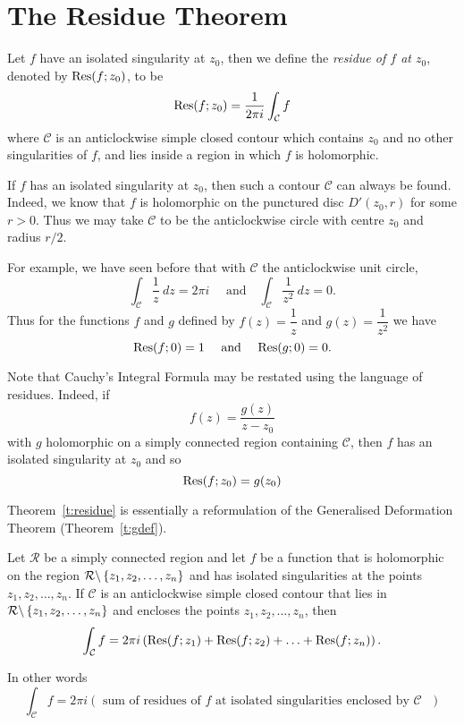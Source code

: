 \section{The Residue Theorem}

\begin{definition}
Let $f$ have an isolated singularity at $z_0$, then we define the \emph{residue of $f$ at $z_0$}, denoted by $\mathrm{Res} (f;z_0)$, to be
\[
\mathrm{Res} (f;z_0) = \frac{1}{2\pi i} \int_{\mathcal{C}} f
\]
where $\mathcal{C}$ is an anticlockwise simple closed contour which contains $z_0$ and no other singularities of $f$, and lies inside a region in which $f$ is holomorphic.
\end{definition}
If $f$ has an isolated singularity at $z_0$, then such a contour $\mathcal{C}$ can always be found.  Indeed, we know that $f$ is holomorphic on the punctured disc $D'(z_0,r)$ for some $r>0$.  Thus we may take $\mathcal{C}$ to be the anticlockwise circle with centre $z_0$ and radius $r/2$.


For example, we have seen before that with $\mathcal{C}$ the anticlockwise unit circle,
\[
\int_{\mathcal{C}} \frac{1}{z}\ dz=2\pi i \quad \text{ and} \quad \int_{\mathcal{C}} \frac{1}{z^2}\ dz = 0.
\]
Thus for the functions $f$ and $g$ defined by $f(z)=\dfrac{1}{z}$ and $g(z) = \dfrac{1}{z^2}$ we have
\[
\mathrm{Res} (f;0)=1 \quad \text{ and } \quad \mathrm{Res} (g;0) = 0.
\]


Note that Cauchy's Integral Formula may be restated using the language of residues.  Indeed, if
\[
f(z) = \frac{g(z)}{z-z_0}
\]
with $g$ holomorphic on a simply connected region containing $\mathcal{C}$, then $f$ has an isolated singularity at $z_0$ and so
\[
 \mathrm{Res} (f;z_0) = g(z_0)
\]
 
Theorem~\ref{t:residue} is essentially a reformulation of the Generalised Deformation Theorem (Theorem~\ref{t:gdef}).
\begin{theorem}
\label{t:residue}
Let $\mathcal{R}$ be a simply connected region and let $f$ be a function that is holomorphic on the region $\mathcal{R} \backslash \left\{ z_1,z_2,\ldots , z_n\right\}$ and has isolated singularities at the points $z_1,z_2,\ldots,z_n$. If $\mathcal{C}$ is an anticlockwise simple closed contour that lies in $\mathcal{R}\backslash \left\{z_1,z_2,\ldots,z_n\right\}$ and encloses the points $z_1,z_2,\ldots,z_n$, then
\[
\int_{\mathcal{C}} f = 2 \pi i \left( \mathrm{Res} (f;z_1)+\mathrm{Res} (f;z_2) + \ldots + \mathrm{Res} (f;z_n ) \right).
\]
\end{theorem}
In other words
\[
\int_{\mathcal{C}} f = 2\pi i \left( \text{ sum of residues of $f$ at isolated singularities enclosed by $\mathcal{C}$ } \right)
\]

